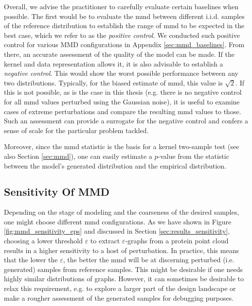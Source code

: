 Overall, we advise the practitioner to carefully evaluate certain baselines when
possible. The first would be to evaluate the \acrshort{mmd} between different
i.i.d. samples of the reference distribution to establish the range of
\acrshort{mmd} to be expected in the best case, which we refer to as the
\emph{positive control}. We conducted such positive control for various MMD
configurations in Appendix \ref{sec:mmd_baselines}. From there, an accurate
assessment of the quality of the model can be made. If the kernel and data
representation allows it, it is also advisable to establish a \emph{negative
control}. This would show the worst possible performance between any two
distributions. Typically, for the biased estimate of \acrshort{mmd}, this value
is $\sqrt{2}$. If this is not possible, as is the case in this thesis (e.g.
there is no negative control for all \acrshort{mmd} values perturbed using the
Gaussian noise), it is useful to examine cases of extreme perturbations and
compare the resulting \acrshort{mmd} values to those. Such an assessment can
provide a surrogate for the negative control and confers a sense of scale for
the particular problem tackled.

Moreover, since the \acrshort{mmd} statistic is the basis for a kernel two-sample test
\citep{gretton2012kernel} (see also Section \ref{sec:mmd}), one can easily
estimate a $p$-value from the statistic between the model's generated
distribution and the empirical distribution.

\subsection{Sensitivity Of MMD}\label{sec:discussion_right_mmd}
Depending on the stage of modeling and the coarseness of the desired samples,
one might choose different \acrshort{mmd} configurations. As we have shown in Figure
\ref{fig:mmd_sensitivity_eps} and discussed in Section
\ref{sec:results_sensitivity}, choosing a lower threshold $\varepsilon$ to
extract $\varepsilon$-graphs from a protein point cloud results in a higher
sensitivity to a host of perturbation. In practice, this means that the lower the
$\varepsilon$, the better the \acrshort{mmd} will be at discerning perturbed (i.e.
generated) samples from reference samples. This might be desirable if one needs
highly similar distributions of graphs. However, it can sometimes be desirable
to relax this requirement, e.g. to explore a larger part of the design landscape
or make a rougher assessment of the generated samples for debugging purposes.

